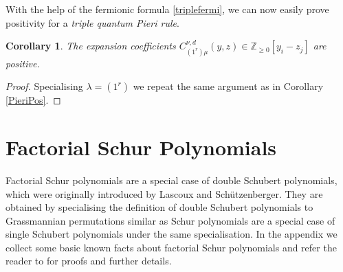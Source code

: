 \documentclass[12pt]{amsart}
\newcommand{\Z}{\mathbb{Z}}
\newtheorem{cor}[prop]{Corollary}
\numberwithin{equation}{section}
\numberwithin{figure}{section}
\begin{document}
With the help of the fermionic formula \eqref{triplefermi}, we can now easily prove positivity for a {\em triple quantum Pieri rule}.
\begin{cor}
    The expansion coefficients $C^{\nu,d}_{(1^r)\mu}(y,z) \in \Z_{\geq 0}[y_i - z_j]$ are positive.
\end{cor}
\begin{proof}
      Specialising $\lambda = (1^r)$ we repeat the same argument as in Corollary \ref{PieriPos}.
\end{proof}
\appendix

\section{Factorial Schur Polynomials}\label{app:A}
Factorial Schur polynomials are a special case of double Schubert polynomials, which were originally introduced by Lascoux and Sch\"utzenberger. They are obtained by specialising the definition of double Schubert polynomials to Grassmannian permutations similar as Schur polynomials are a special case of single Schubert polynomials under the same specialisation. In the appendix we collect some basic known facts about factorial Schur polynomials and refer the reader to \cite{Mac92} for proofs and further details. 
\end{document}
